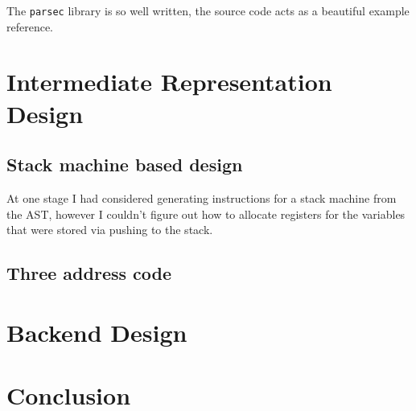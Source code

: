 \documentclass[11pt]{article}
\begin{document}
The \verb~parsec~ library is so well written, the source code acts as a
beautiful example reference. 
\section{Intermediate Representation Design}
\label{sec-3}
\subsection{Stack machine based design}
\label{sec-3-1}
At one stage I had considered generating instructions for a stack
machine from the AST, however I couldn't figure out how to allocate
registers for the variables that were stored via pushing to the stack.
\subsection{Three address code}
\label{sec-3-2}
\section{Backend Design}
\label{sec-4}
\section{Conclusion}
\label{sec-5}
\end{document}
